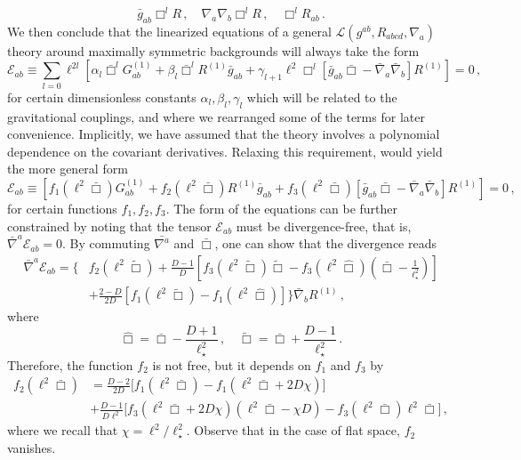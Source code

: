 \documentclass[11pt]{article}
\begin{document}
\begin{equation}
\bar g_{ab} \Box^l R\, , \quad \nabla_a\nabla_b \Box^l R\, , \quad \Box^lR_{ab}\, .
\end{equation}
We then conclude that the linearized equations of a general $\mathcal{L}(g^{ab},R_{abcd},\nabla_a)$ theory around maximally symmetric backgrounds will always take the form
\begin{equation}\label{eq:Eab general msb}
\mathcal{E}_{ab}\equiv \sum_{l=0}\ell^{2l} \left[ \alpha_l  \bar \Box^l G^{(1)}_{ab}+ \beta_l  \bar \Box^l R^{(1)} \bar g_{ab} +\gamma_{l+1} \ell^2 \Box^l [\bar g_{ab}\bar \Box- \bar\nabla_a\bar\nabla_b]  R^{(1)} \right] = 0\, ,
\end{equation}
for certain dimensionless constants $\alpha_l,\beta_l,\gamma_l$ which will be related to the gravitational couplings, and where we rearranged some of the terms for later convenience. Implicitly, we have assumed that the theory involves a polynomial dependence on the covariant derivatives. Relaxing this requirement, would yield the more general form
\begin{equation}\label{eq:Eab general msb2}
\mathcal{E}_{ab}\equiv \left[ f_1(\ell^2 \bar \Box) G^{(1)}_{ab}+  f_2(\ell^2 \bar \Box) R^{(1)} \bar g_{ab} +   f_3(\ell^2 \bar \Box)  [\bar g_{ab}\bar \Box- \bar\nabla_a\bar\nabla_b]R^{(1)} \right] = 0\, ,
\end{equation}
for certain functions $f_1, f_2, f_3$. The form of the equations can be further constrained by noting that the tensor $\mathcal{E}_{ab}$ must be divergence-free, that is, $\bar\nabla^{a}\mathcal{E}_{ab}=0$. By commuting $\bar{\nabla^{a}}$ and $\bar\Box$, one can show that the divergence reads
\begin{equation}
\begin{aligned}
\bar\nabla^{a}\mathcal{E}_{ab}=\Bigg\{&f_2\left(\ell^2\tilde \Box\right)+\frac{D-1}{D}\left[f_{3}\left(\ell^2\tilde \Box\right)\tilde\Box-f_{3}\left(\ell^2\hat \Box\right)\left(\bar\Box-\frac{1}{\ell_{\star}^2}\right)\right]\\
&+\frac{2-D}{2D}\left[f_{1}\left(\ell^2\tilde \Box\right)-f_{1}\left(\ell^2\hat\Box\right)\right]\Bigg\}\bar\nabla_{b}R^{(1)}\, ,
\end{aligned}
\end{equation}
where
\begin{equation}
\hat\Box=\bar\Box-\frac{D+1}{\ell_{\star}^2}\, ,\quad \tilde\Box=\bar\Box+\frac{D-1}{\ell_{\star}^2}\, .
\end{equation}
Therefore, the function $f_2$ is not free, but it depends on $f_1$ and $f_3$ by
\begin{equation}\label{f2relation}
\begin{aligned}
f_2\left(\ell^2\bar\Box\right)&=\frac{D-2}{2D}\Big[f_1\left(\ell^2\bar\Box\right)-f_1\left(\ell^2\bar\Box+2D\chi\right)\Big]
\\
&+\frac{D-1}{D\ell^2}\Big[f_3\left(\ell^2\bar\Box+2D \chi\right)\left(\ell^2\bar\Box-\chi D\right)-f_3\left(\ell^2\bar\Box\right)
\ell^2\bar\Box\Big]\, ,
\end{aligned}
\end{equation}
where we recall that $\chi=\ell^2/\ell_{\star}^2$. Observe that in the case of flat space, $f_2$ vanishes. 
\end{document}
